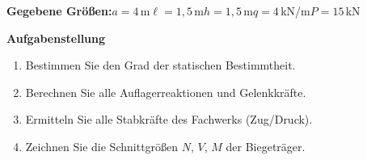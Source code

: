 \documentclass[a4paper,11pt]{article}
\begin{document}
\textbf{Gegebene Größen:}\quad $a=4$\,m\quad $\ell=1,5$\,m\quad $h=1,5$\,m\quad $q=4$\,kN/m\quad $P=15$\,kN
\par\medskip
\textbf{Aufgabenstellung}\par
\begin{enumerate}[label=\textbf{\arabic*.}]
  \item Bestimmen Sie den Grad der statischen Bestimmtheit.
  \item Berechnen Sie alle Auflagerreaktionen und Gelenkkräfte.
  \item Ermitteln Sie alle Stabkräfte des Fachwerks (Zug/Druck).
  \item Zeichnen Sie die Schnittgrößen $N$, $V$, $M$ der Biegeträger.
\end{enumerate}
\end{document}
